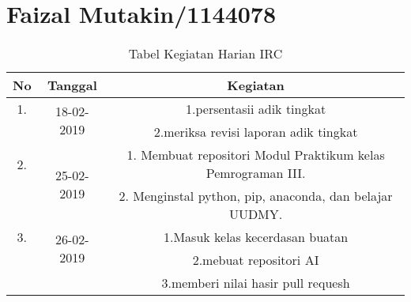 \chapter{Faizal Mutakin/1144078}
\begin{table}[h]
\caption{Tabel Kegiatan Harian IRC}
\centering
\begin{tabular}{|c|c|c|}
\hline
No&Tanggal&Kegiatan\\
\hline
1.&\multirow{2}{*}{18-02-2019}&1.persentasii adik tingkat\\
&&2.meriksa revisi laporan adik tingkat\\
\hline
2.&\multirow{2}{*}{25-02-2019}&1. Membuat repositori Modul Praktikum kelas Pemrograman III.\\
&&2. Menginstal python, pip, anaconda, dan belajar UUDMY.\\
\hline
3.&\multirow{2}{*}{26-02-2019}&1.Masuk kelas kecerdasan buatan\\
&&2.mebuat repositori AI\\
&&3.memberi nilai hasir pull requesh\\
\hline
\end{tabular}
\label{table:contoh}
\end{table}